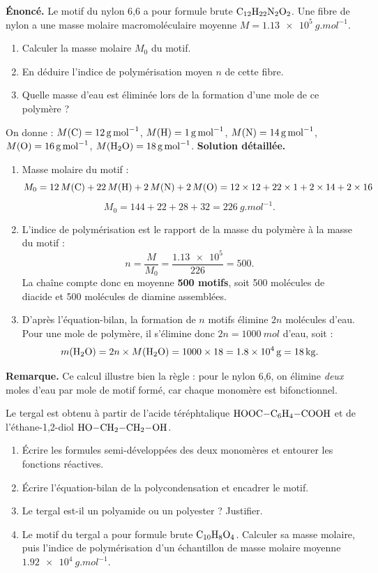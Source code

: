 \documentclass[11pt]{article}
\begin{document}
\begin{exoresolu}
\textbf{Énoncé.} Le motif du nylon 6,6 a pour formule brute $\ce{C12H22N2O2}$. Une fibre de nylon a une masse molaire macromoléculaire moyenne $M = \SI{1,13e5}{g.mol^{-1}}$.
\begin{enumerate}
\item Calculer la masse molaire $M_0$ du motif.
\item En déduire l'indice de polymérisation moyen $n$ de cette fibre.
\item Quelle masse d'eau est éliminée lors de la formation d'une mole de ce polymère ?
\end{enumerate}
On donne : $M(\ce{C}) = \SI{12}{g.mol^{-1}}$, $M(\ce{H}) = \SI{1}{g.mol^{-1}}$, $M(\ce{N}) = \SI{14}{g.mol^{-1}}$, $M(\ce{O}) = \SI{16}{g.mol^{-1}}$, $M(\ce{H2O}) = \SI{18}{g.mol^{-1}}$.
\tcblower
\textbf{Solution détaillée.}
\begin{enumerate}
\item Masse molaire du motif :
\[ M_0 = 12\,M(\ce{C}) + 22\,M(\ce{H}) + 2\,M(\ce{N}) + 2\,M(\ce{O}) = 12\times 12 + 22\times 1 + 2\times 14 + 2\times 16 \]
\[ M_0 = 144 + 22 + 28 + 32 = \SI{226}{g.mol^{-1}}. \]
\item L'indice de polymérisation est le rapport de la masse du polymère à la masse du motif :
\[ n = \frac{M}{M_0} = \frac{\num{1,13e5}}{226} = 500. \]
La chaîne compte donc en moyenne \textbf{500 motifs}, soit 500 molécules de diacide et 500 molécules de diamine assemblées.
\item D'après l'équation-bilan, la formation de $n$ motifs élimine $2n$ molécules d'eau. Pour une mole de polymère, il s'élimine donc $2n = \SI{1000}{mol}$ d'eau, soit :
\[ m(\ce{H2O}) = 2n \times M(\ce{H2O}) = 1000 \times 18 = \SI{1,8e4}{g} = \SI{18}{kg}. \]
\end{enumerate}
\textbf{Remarque.} Ce calcul illustre bien la règle : pour le nylon 6,6, on élimine \emph{deux} moles d'eau par mole de motif formé, car chaque monomère est bifonctionnel.
\end{exoresolu}

\begin{exercice}
Le tergal est obtenu à partir de l'acide téréphtalique $\ce{HOOC-C6H4-COOH}$ et de l'éthane-1,2-diol $\ce{HO-CH2-CH2-OH}$.
\begin{enumerate}
\item Écrire les formules semi-développées des deux monomères et entourer les fonctions réactives.
\item Écrire l'équation-bilan de la polycondensation et encadrer le motif.
\item Le tergal est-il un polyamide ou un polyester ? Justifier.
\item Le motif du tergal a pour formule brute $\ce{C10H8O4}$. Calculer sa masse molaire, puis l'indice de polymérisation d'un échantillon de masse molaire moyenne $\SI{1,92e4}{g.mol^{-1}}$.
\end{enumerate}
\end{exercice}
\end{document}
